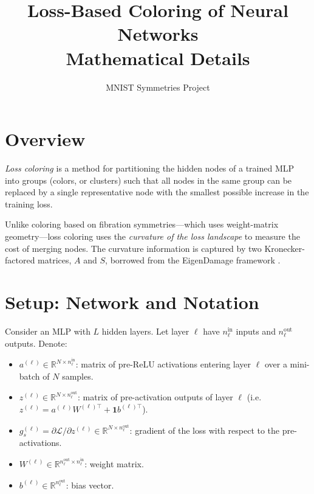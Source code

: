 \documentclass[11pt]{article}
\title{\textbf{Loss-Based Coloring of Neural Networks}\\
\large Mathematical Details}
\author{MNIST Symmetries Project}
\date{}
\begin{document}
\maketitle

\tableofcontents
\bigskip

\section{Overview}

\textit{Loss coloring} is a method for partitioning the hidden nodes of a
trained MLP into groups (colors, or clusters) such that all nodes in the same
group can be replaced by a single representative node with the smallest
possible increase in the training loss.

Unlike coloring based on fibration symmetries---which uses weight-matrix
geometry---loss coloring uses the \emph{curvature of the loss landscape} to
measure the cost of merging nodes. The curvature information is captured by
two Kronecker-factored matrices, $A$ and $S$, borrowed from the EigenDamage
framework \cite{george2018eigendamage}.

\section{Setup: Network and Notation}

Consider an MLP with $L$ hidden layers. Let layer $\ell$ have $n_\ell^{\mathrm{in}}$
inputs and $n_\ell^{\mathrm{out}}$ outputs. Denote:

\begin{itemize}
  \item $a^{(\ell)} \in \mathbb{R}^{N \times n_\ell^{\mathrm{in}}}$: matrix of
        pre-ReLU activations entering layer $\ell$ over a mini-batch of $N$ samples.
  \item $z^{(\ell)} \in \mathbb{R}^{N \times n_\ell^{\mathrm{out}}}$: matrix of
        pre-activation outputs of layer $\ell$ (i.e.\ $z^{(\ell)} = a^{(\ell)} W^{(\ell)\top} + \mathbf{1}b^{(\ell)\top}$).
  \item $g_s^{(\ell)} = \partial \mathcal{L} / \partial z^{(\ell)} \in \mathbb{R}^{N \times n_\ell^{\mathrm{out}}}$:
        gradient of the loss with respect to the pre-activations.
  \item $W^{(\ell)} \in \mathbb{R}^{n_\ell^{\mathrm{out}} \times n_\ell^{\mathrm{in}}}$: weight matrix.
  \item $b^{(\ell)} \in \mathbb{R}^{n_\ell^{\mathrm{out}}}$: bias vector.
\end{itemize}
\end{document}
